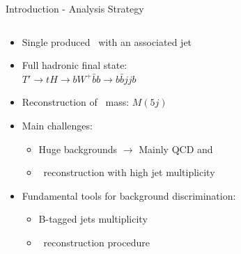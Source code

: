 \iffalse
\begin{frame}{Introduction - Analysis Strategy}
\vspace{-.2cm}
\begin{columns}

\begin{column}{.50\textwidth}
\begin{block}{}
\begin{itemize}\scriptsize
\item Single produced \Tp~with an associated jet
\item Full hadronic final state: \\ $T'\to t H \to b W^{+} \bar{b} b \to b \bar{b} j j b$
\item Reconstruction of \Tp~mass: $M(5j)$
\item Main challenges:
  \begin{itemize}\scriptsize
  \item Huge backgrounds $\rightarrow$ Mainly QCD and \ttbar
  \item \Tp~reconstruction with high jet multiplicity
  \end{itemize}
\item Fundamental tools for background discrimination:
  \begin{itemize}\scriptsize
  \item B-tagged jets multiplicity
  \item \Tp~reconstruction procedure
  \end{itemize}
\end{itemize}
\end{block}
\end{column}


\end{columns}
\end{frame}

